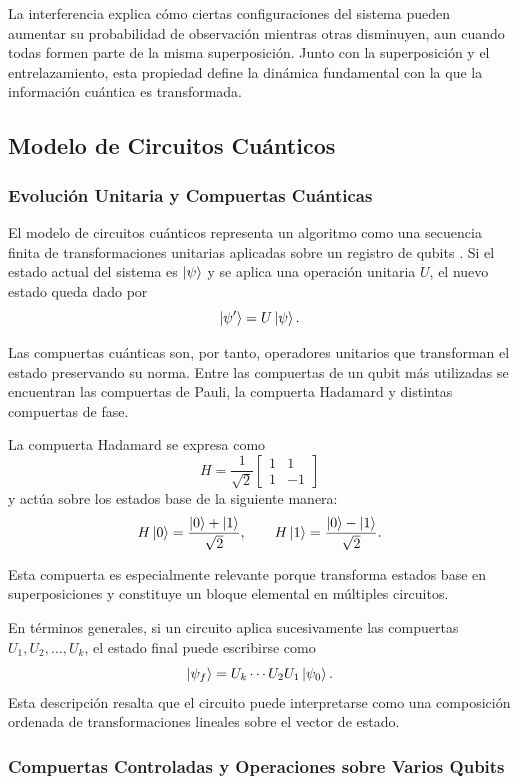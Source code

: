 La interferencia explica cómo ciertas configuraciones del sistema pueden aumentar su probabilidad de observación mientras otras disminuyen, aun cuando todas formen parte de la misma superposición. Junto con la superposición y el entrelazamiento, esta propiedad define la dinámica fundamental con la que la información cuántica es transformada.

\subsection{Modelo de Circuitos Cuánticos}

\subsubsection{Evolución Unitaria y Compuertas Cuánticas}

El modelo de circuitos cuánticos representa un algoritmo como una secuencia finita de transformaciones unitarias aplicadas sobre un registro de qubits \parencite{Nielsen2010}. Si el estado actual del sistema es $\ket{\psi}$ y se aplica una operación unitaria $U$, el nuevo estado queda dado por
\[
    \ket{\psi'} = U\ket{\psi}.
\]

Las compuertas cuánticas son, por tanto, operadores unitarios que transforman el estado preservando su norma. Entre las compuertas de un qubit más utilizadas se encuentran las compuertas de Pauli, la compuerta Hadamard y distintas compuertas de fase.

La compuerta Hadamard se expresa como
\[
    H = \frac{1}{\sqrt{2}}
    \begin{bmatrix}
        1 & 1 \\
        1 & -1
    \end{bmatrix}
\]
y actúa sobre los estados base de la siguiente manera:
\[
    H\ket{0} = \frac{\ket{0} + \ket{1}}{\sqrt{2}}, \qquad
    H\ket{1} = \frac{\ket{0} - \ket{1}}{\sqrt{2}}.
\]

Esta compuerta es especialmente relevante porque transforma estados base en superposiciones y constituye un bloque elemental en múltiples circuitos.

En términos generales, si un circuito aplica sucesivamente las compuertas $U_1, U_2, \ldots, U_k$, el estado final puede escribirse como
\[
    \ket{\psi_f} = U_k \cdots U_2 U_1 \ket{\psi_0}.
\]
Esta descripción resalta que el circuito puede interpretarse como una composición ordenada de transformaciones lineales sobre el vector de estado.

\subsubsection{Compuertas Controladas y Operaciones sobre Varios Qubits}

